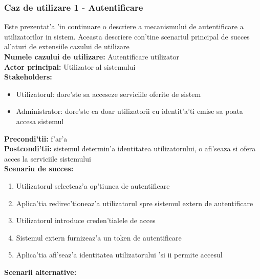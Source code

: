 \documentclass[12pt,a4paper,twoside]{report}
\begin{document}
 \subsubsection{Caz de utilizare 1 - Autentificare}
 Este prezentat'a 'in continuare o descriere a mecanismului de autentificare a utilizatorilor in sistem. Aceasta descriere con'tine scenariul principal de succes al'aturi de extensiile cazului de utilizare\\
\textbf{Numele cazului de utilizare:} Autentificare utilizator\\
\textbf{Actor principal:} Utilizator al sistemului\\
\textbf{Stakeholders:}
\begin{itemize}
    \item Utilizatorul: dore'ste sa acceseze serviciile oferite de sistem
    \item Administrator: dore'ste ca doar utilizatorii cu identit'a'ti emise sa poata accesa sistemul
\end{itemize}
\textbf{Precondi'tii:} f'ar'a\\
\textbf{Postcondi'tii:} sistemul determin'a identitatea utilizatorului, o afi'seaza si ofera acces la serviciile sistemului\\
\textbf{Scenariu de succes:} 
\begin{enumerate}
     \item Utilizatorul selecteaz'a op'tiunea de autentificare
     \item Aplica'tia redirec'tioneaz'a utilizatorul spre sistemul extern de autentificare
     \item Utilizatorul introduce creden'tialele de acces
     \item Sistemul extern furnizeaz'a un token de autentificare
     \item  Aplica'tia afi'seaz'a identitatea utilizatorului 'si ii permite accesul
\end{enumerate}
\textbf{Scenarii alternative:}
\end{document}

